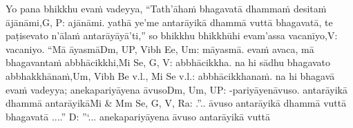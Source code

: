Yo pana bhikkhu evaṁ vadeyya, ``Tath'āhaṁ bhagavatā dhammaṁ desitaṁ ājānāmi,\makeatletter\hyperlink{endnote-appendix}\makeatother G, P: ajānāmi. yathā ye'me antarāyikā dhammā vuttā bhagavatā, te paṭisevato n'ālaṁ antarāyāyā'ti,'' so bhikkhu bhikkhūhi evam'assa vacanīyo,\makeatletter\hyperlink{endnote-appendix}\makeatother V: vacaniyo. ``Mā āyasmā\makeatletter\hyperlink{endnote-appendix}\makeatother Dm, UP, Vibh Ee, Um: māyasmā. evaṁ avaca, mā bhagavantaṁ abbhācikkhi,\makeatletter\hyperlink{endnote-appendix}\makeatother Mi Se, G, V: abbhācikkha. na hi sādhu bhagavato abbhakkhānaṁ,\makeatletter\hyperlink{endnote-appendix}\makeatother Um, Vibh Be v.l., Mi Se v.l.: abbhācikkhanaṁ. na hi bhagavā evaṁ vadeyya; anekapariyāyena āvuso\makeatletter\hyperlink{endnote-appendix}\makeatother Dm, Um, UP: -pariyāyenāvuso. antarāyikā dhammā antarāyikā\makeatletter\hyperlink{endnote-appendix}\makeatother Mi & Mm Se, G, V, Ra: .”..  āvuso antarāyikā dhammā vuttā bhagavatā  ....” D: ”`...  anekapariyāyena āvuso antarāyikā vuttā
